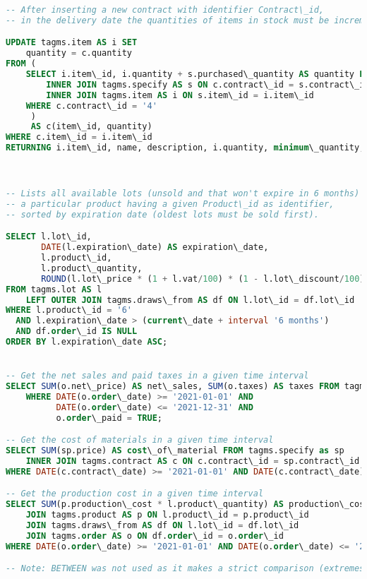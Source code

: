 \begin{lstlisting}[language=SQL,
keywordstyle=\color{blue},
stringstyle=\color{mauve},
showstringspaces=false,
basicstyle=\ttfamily\footnotesize]
-- After inserting a new contract with identifier Contract\_id,
-- in the delivery date the quantities of items in stock must be incremented

UPDATE tagms.item AS i SET
    quantity = c.quantity
FROM (
    SELECT i.item\_id, i.quantity + s.purchased\_quantity AS quantity FROM tagms.contract AS c
        INNER JOIN tagms.specify AS s ON c.contract\_id = s.contract\_id
        INNER JOIN tagms.item AS i ON s.item\_id = i.item\_id
    WHERE c.contract\_id = '4'
     )
     AS c(item\_id, quantity)
WHERE c.item\_id = i.item\_id
RETURNING i.item\_id, name, description, i.quantity, minimum\_quantity, item\_category\_id;



-- Lists all available lots (unsold and that won't expire in 6 months) containing
-- a particular product having a given Product\_id as identifier,
-- sorted by expiration date (oldest lots must be sold first).

SELECT l.lot\_id,
       DATE(l.expiration\_date) AS expiration\_date,
       l.product\_id,
       l.product\_quantity,
       ROUND(l.lot\_price * (1 + l.vat/100) * (1 - l.lot\_discount/100), 2) AS gross\_price
FROM tagms.lot AS l
    LEFT OUTER JOIN tagms.draws\_from AS df ON l.lot\_id = df.lot\_id
WHERE l.product\_id = '6'
  AND l.expiration\_date > (current\_date + interval '6 months')
  AND df.order\_id IS NULL
ORDER BY l.expiration\_date ASC;


-- Get the net sales and paid taxes in a given time interval
SELECT SUM(o.net\_price) AS net\_sales, SUM(o.taxes) AS taxes FROM tagms.order AS o
    WHERE DATE(o.order\_date) >= '2021-01-01' AND
          DATE(o.order\_date) <= '2021-12-31' AND
          o.order\_paid = TRUE;

-- Get the cost of materials in a given time interval
SELECT SUM(sp.price) AS cost\_of\_material FROM tagms.specify as sp
    INNER JOIN tagms.contract AS c ON c.contract\_id = sp.contract\_id
WHERE DATE(c.contract\_date) >= '2021-01-01' AND DATE(c.contract\_date) <= '2021-12-31';

-- Get the production cost in a given time interval
SELECT SUM(p.production\_cost * l.product\_quantity) AS production\_cost FROM tagms.lot AS l
    JOIN tagms.product AS p ON l.product\_id = p.product\_id
    JOIN tagms.draws\_from AS df ON l.lot\_id = df.lot\_id
    JOIN tagms.order AS o ON df.order\_id = o.order\_id
WHERE DATE(o.order\_date) >= '2021-01-01' AND DATE(o.order\_date) <= '2021-12-31';

-- Note: BETWEEN was not used as it makes a strict comparison (extremes excluded)



\end{lstlisting}
